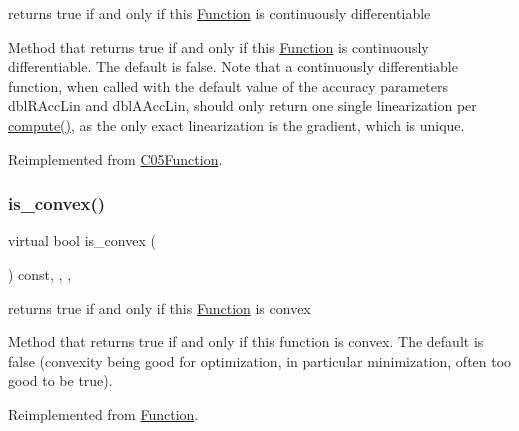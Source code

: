 returns true if and only if this \mbox{\hyperlink{class_s_m_spp__di__unipi__it_1_1_function}{Function}} is continuously differentiable 

Method that returns true if and only if this \mbox{\hyperlink{class_s_m_spp__di__unipi__it_1_1_function}{Function}} is continuously differentiable. The default is false. Note that a continuously differentiable function, when called with the default value of the accuracy parameters dbl\+R\+Acc\+Lin and dbl\+A\+Acc\+Lin, should only return one single linearization per \mbox{\hyperlink{class_s_m_spp__di__unipi__it_1_1_linear_function_afc8ff54ab05d22f4cca0fb0bfbeb7a49}{compute()}}, as the only exact linearization is the gradient, which is unique. 

Reimplemented from \mbox{\hyperlink{class_s_m_spp__di__unipi__it_1_1_c05_function_ade71194d2205da239374eeeb8ba82b11}{C05\+Function}}.

\mbox{\label{class_s_m_spp__di__unipi__it_1_1_linear_function_a13b81428d5637e56d77e2168ab66ea44}} 
\subsubsection{\texorpdfstring{is\+\_\+convex()}{is\_convex()}}
{\footnotesize\ttfamily virtual bool is\+\_\+convex (\begin{DoxyParamCaption}\item[{void}]{ }\end{DoxyParamCaption}) const\hspace{0.3cm}{\ttfamily [inline]}, {\ttfamily [final]}, {\ttfamily [override]}, {\ttfamily [virtual]}}



returns true if and only if this \mbox{\hyperlink{class_s_m_spp__di__unipi__it_1_1_function}{Function}} is convex 

Method that returns true if and only if this function is convex. The default is false (convexity being good for optimization, in particular minimization, often too good to be true). 

Reimplemented from \mbox{\hyperlink{class_s_m_spp__di__unipi__it_1_1_function_a8eac4d4ff5bcf2e564138655ee01ece8}{Function}}.

